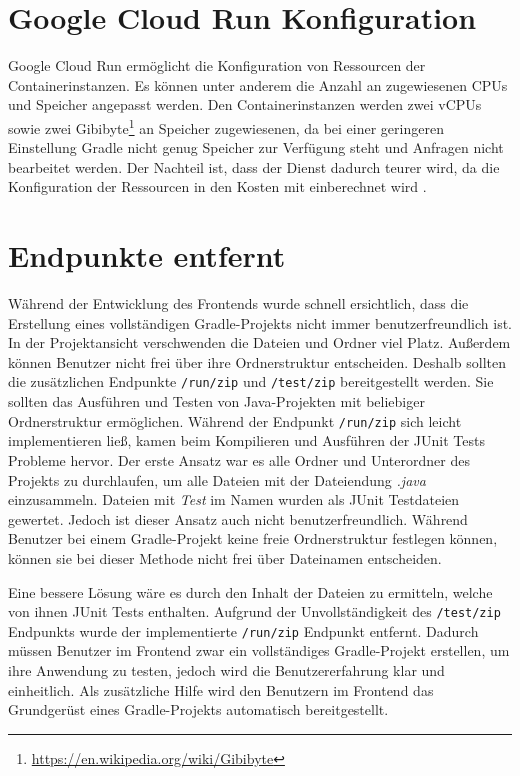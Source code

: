 \section{Google Cloud Run Konfiguration}
Google Cloud Run ermöglicht die Konfiguration von Ressourcen der
Containerinstanzen. Es können unter anderem die Anzahl an zugewiesenen CPUs \cite{CloudRunCpuAlloc} und
Speicher \cite{CloudRunMemLimits} angepasst werden.
Den Containerinstanzen werden zwei vCPUs sowie zwei Gibibyte\footnote{\url{https://en.wikipedia.org/wiki/Gibibyte}}
an Speicher zugewiesenen, da bei einer geringeren Einstellung Gradle
nicht genug Speicher zur Verfügung steht und Anfragen nicht bearbeitet werden.
Der Nachteil ist, dass der Dienst dadurch teurer wird,
da die Konfiguration der Ressourcen in den Kosten mit einberechnet wird \cite{CloudRunPricing}.

\section{Endpunkte entfernt}
Während der Entwicklung des Frontends wurde schnell ersichtlich,
dass die Erstellung eines vollständigen Gradle-Projekts nicht immer benutzerfreundlich ist.
In der Projektansicht verschwenden die Dateien und Ordner viel Platz.
Außerdem können Benutzer nicht frei über ihre Ordnerstruktur entscheiden.
Deshalb sollten die zusätzlichen Endpunkte \texttt{/run/zip} und \texttt{/test/zip}
bereitgestellt werden. Sie sollten das Ausführen und Testen von Java-Projekten mit
beliebiger Ordnerstruktur ermöglichen.
Während der Endpunkt \texttt{/run/zip} sich leicht implementieren ließ, kamen
beim Kompilieren und Ausführen der JUnit Tests Probleme hervor.
Der erste Ansatz war es alle Ordner und Unterordner des Projekts zu
durchlaufen, um alle Dateien mit der Dateiendung \emph{.java} einzusammeln.
Dateien mit \emph{Test} im Namen wurden als JUnit Testdateien gewertet. Jedoch
ist dieser Ansatz auch nicht benutzerfreundlich. Während Benutzer
bei einem Gradle-Projekt keine freie Ordnerstruktur festlegen können,
können sie bei dieser Methode nicht frei über Dateinamen entscheiden.

Eine bessere Lösung wäre es durch den Inhalt der Dateien zu ermitteln,
welche von ihnen JUnit Tests enthalten. Aufgrund der Unvollständigkeit
des \texttt{/test/zip} Endpunkts wurde der implementierte
\texttt{/run/zip} Endpunkt entfernt. Dadurch müssen Benutzer im
Frontend zwar ein vollständiges Gradle-Projekt erstellen,
um ihre Anwendung zu testen,
jedoch wird die Benutzererfahrung klar und einheitlich.
Als zusätzliche Hilfe wird den Benutzern im Frontend das Grundgerüst eines Gradle-Projekts
automatisch bereitgestellt.

